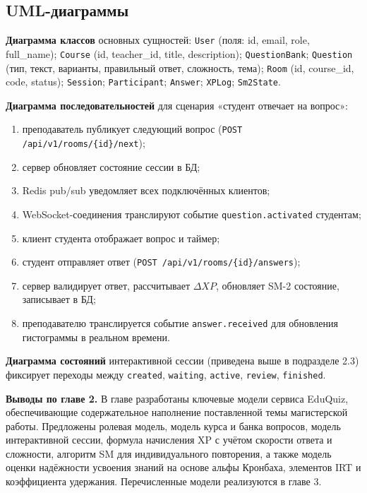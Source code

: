 \subsection{UML-диаграммы}


\textbf{Диаграмма классов} основных сущностей:
\texttt{User} (поля: id, email, role, full\_name); \texttt{Course}
(id, teacher\_id, title, description); \texttt{QuestionBank};
\texttt{Question} (тип, текст, варианты, правильный ответ,
сложность, тема); \texttt{Room} (id, course\_id, code, status);
\texttt{Session}; \texttt{Participant}; \texttt{Answer};
\texttt{XPLog}; \texttt{Sm2State}.

\textbf{Диаграмма последовательностей} для сценария
«студент отвечает на вопрос»:
\begin{enumerate}[label=\arabic*., noitemsep]
    \item преподаватель публикует следующий вопрос
          (\texttt{POST /api/v1/rooms/\{id\}/next});
    \item сервер обновляет состояние сессии в БД;
    \item Redis pub/sub уведомляет всех подключённых клиентов;
    \item WebSocket-соединения транслируют событие
          \texttt{question.activated} студентам;
    \item клиент студента отображает вопрос и таймер;
    \item студент отправляет ответ
          (\texttt{POST /api/v1/rooms/\{id\}/answers});
    \item сервер валидирует ответ, рассчитывает $\Delta XP$,
          обновляет SM-2 состояние, записывает в БД;
    \item преподавателю транслируется событие \texttt{answer.received}
          для обновления гистограммы в реальном времени.
\end{enumerate}

\textbf{Диаграмма состояний} интерактивной сессии (приведена выше
в подразделе 2.3) фиксирует переходы между \texttt{created},
\texttt{waiting}, \texttt{active}, \texttt{review}, \texttt{finished}.

\textbf{Выводы по главе 2.}
В главе разработаны ключевые модели сервиса EduQuiz, обеспечивающие
содержательное наполнение поставленной темы магистерской работы.
Предложены ролевая модель, модель курса и банка вопросов, модель
интерактивной сессии, формула начисления XP с учётом скорости
ответа и сложности, алгоритм SM для индивидуального
повторения, а также модель оценки надёжности усвоения знаний
на основе альфы Кронбаха, элементов IRT и коэффициента удержания.
Перечисленные модели реализуются в главе 3.

\newpage
